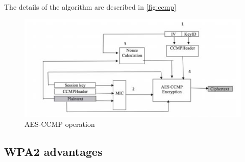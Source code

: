 The details of the algorithm are described in \autoref{fig:ccmp}%

\begin{figure}
	\includegraphics[scale=0.3]{images/ccmp.png}
	\caption{AES-CCMP operation}
	\label{fig:ccmp}
\end{figure}

\subsection{WPA2 advantages}
